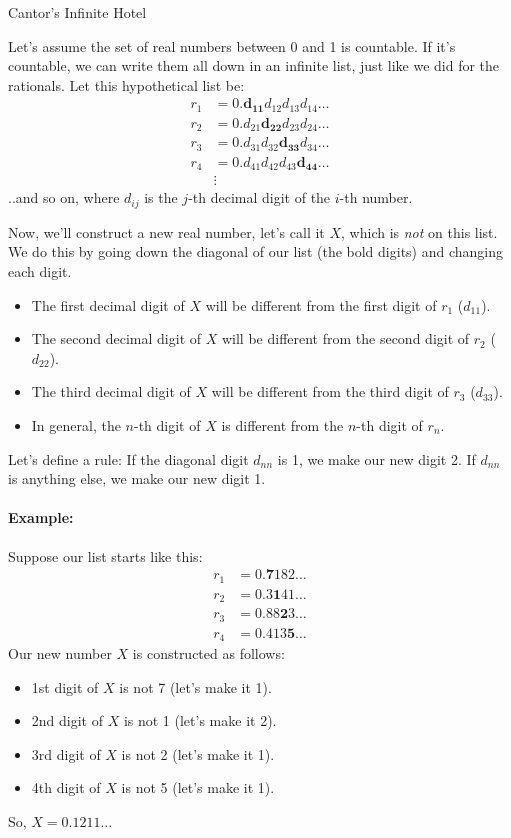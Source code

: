 \begin{funfactsbreak}{Cantor's Infinite Hotel}

Let's assume the set of real numbers between 0 and 1 is countable. If it's countable, we can write them all down in an infinite list, just like we did for the rationals. Let this hypothetical list be:
\begin{align*}
r_1 &= 0.\mathbf{d_{11}}d_{12}d_{13}d_{14}\dots \\
r_2 &= 0.d_{21}\mathbf{d_{22}}d_{23}d_{24}\dots \\
r_3 &= 0.d_{31}d_{32}\mathbf{d_{33}}d_{34}\dots \\
r_4 &= 0.d_{41}d_{42}d_{43}\mathbf{d_{44}}\dots \\
&\vdots
\end{align*}
..and so on, where $d_{ij}$ is the $j$-th decimal digit of the $i$-th number.

Now, we'll construct a new real number, let's call it $X$, which is \emph{not} on this list. We do this by going down the diagonal of our list (the bold digits) and changing each digit.
\begin{itemize}
\item The first decimal digit of $X$ will be different from the first digit of $r_1$ ($d_{11}$).
\item The second decimal digit of $X$ will be different from the second digit of $r_2$ ($d_{22}$).
\item The third decimal digit of $X$ will be different from the third digit of $r_3$ ($d_{33}$).
\item In general, the $n$-th digit of $X$ is different from the $n$-th digit of $r_n$.
\end{itemize}
Let's define a rule: If the diagonal digit $d_{nn}$ is 1, we make our new digit 2. If $d_{nn}$ is anything else, we make our new digit 1.

\paragraph{Example:}
Suppose our list starts like this:
\begin{align*}
r_1 &= 0.\mathbf{7}182\dots \\
r_2 &= 0.3\mathbf{1}41\dots \\
r_3 &= 0.88\mathbf{2}3\dots \\
r_4 &= 0.413\mathbf{5}\dots
\end{align*}
Our new number $X$ is constructed as follows:
\begin{itemize}
\item 1st digit of $X$ is not 7 (let's make it 1).
\item 2nd digit of $X$ is not 1 (let's make it 2).
\item 3rd digit of $X$ is not 2 (let's make it 1).
\item 4th digit of $X$ is not 5 (let's make it 1).
\end{itemize}
So, $X = 0.1211\dots$


\end{funfactsbreak}
